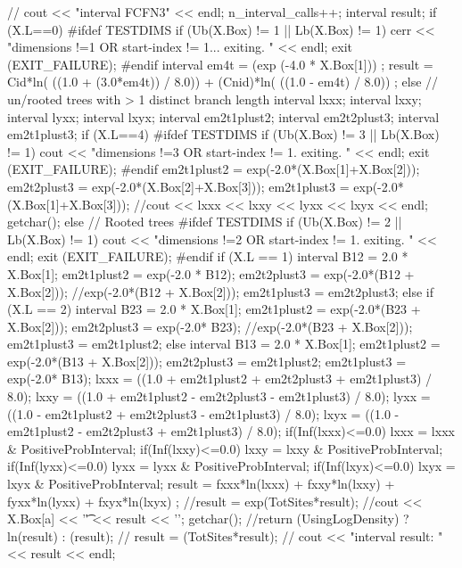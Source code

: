 \begin{DoxyCode}
{ 
  // cout << "interval FCFN3" << endl;
  n_interval_calls++;
  interval result;
  if (X.L==0)       
  {
    #ifdef TESTDIMS
    if (Ub(X.Box) != 1 || Lb(X.Box) != 1)
    {
      cerr << "dimensions !=1 OR start-index != 1... exiting. " 
           << endl; exit (EXIT_FAILURE);
    }
    #endif
    interval em4t = (exp (-4.0 * X.Box[1])) ;
    result = Cid*ln( ((1.0 + (3.0*em4t)) / 8.0)) + 
             (Cnid)*ln( ((1.0 - em4t) / 8.0)) ;
  }
  else      // un/rooted trees with > 1 distinct branch length
  {
    interval lxxx;
    interval lxxy;
    interval lyxx;
    interval lxyx;
    interval em2t1plust2;
    interval em2t2plust3;
    interval em2t1plust3;
    if (X.L==4)     
    {
      #ifdef TESTDIMS
      if (Ub(X.Box) != 3 || Lb(X.Box) != 1)
      {
        cout << "dimensions !=3 OR start-index != 1. exiting. " 
             << endl; exit (EXIT_FAILURE);
      }
      #endif
      em2t1plust2 = exp(-2.0*(X.Box[1]+X.Box[2]));
      em2t2plust3 = exp(-2.0*(X.Box[2]+X.Box[3]));
      em2t1plust3 = exp(-2.0*(X.Box[1]+X.Box[3]));
      //cout << lxxx << lxxy << lyxx << lxyx << endl; getchar();
    }
    else            // Rooted trees
    {
      #ifdef TESTDIMS
      if (Ub(X.Box) != 2 || Lb(X.Box) != 1)
      {
        cout << "dimensions !=2 OR start-index != 1. exiting. " 
             << endl; exit (EXIT_FAILURE);
      }
      #endif
      if (X.L == 1) 
      {
        interval B12 = 2.0 * X.Box[1];
        em2t1plust2 = exp(-2.0 * B12);
        em2t2plust3 = exp(-2.0*(B12 + X.Box[2]));
                    //exp(-2.0*(B12 + X.Box[2]));
        em2t1plust3 = em2t2plust3;
      }
      else if (X.L == 2)
      {
        interval B23 = 2.0 * X.Box[1];
        em2t1plust2 = exp(-2.0*(B23 + X.Box[2]));
        em2t2plust3 = exp(-2.0* B23);
                    //exp(-2.0*(B23 + X.Box[2]));
        em2t1plust3 = em2t1plust2;
      }
      else          
      {
        interval B13 = 2.0 * X.Box[1];
        em2t1plust2 = exp(-2.0*(B13 + X.Box[2]));
        em2t2plust3 = em2t1plust2;
        em2t1plust3 = exp(-2.0* B13);
      }
    }
    lxxx = ((1.0 + em2t1plust2 + em2t2plust3 + em2t1plust3) / 8.0);
    lxxy = ((1.0 + em2t1plust2 - em2t2plust3 - em2t1plust3) / 8.0);
    lyxx = ((1.0 - em2t1plust2 + em2t2plust3 - em2t1plust3) / 8.0);
    lxyx = ((1.0 - em2t1plust2 - em2t2plust3 + em2t1plust3) / 8.0);
    if(Inf(lxxx)<=0.0) lxxx = lxxx & PositiveProbInterval;
    if(Inf(lxxy)<=0.0) lxxy = lxxy & PositiveProbInterval;
    if(Inf(lyxx)<=0.0) lyxx = lyxx & PositiveProbInterval;
    if(Inf(lxyx)<=0.0) lxyx = lxyx & PositiveProbInterval;
    result = fxxx*ln(lxxx) + fxxy*ln(lxxy) + fyxx*ln(lyxx) + fxyx*ln(lxyx) ;
  }
  //result = exp(TotSites*result);
  //cout << X.Box[a] << '\t' << result << '\n'; getchar();
  //return (UsingLogDensity) ? ln(result) : (result);
  // result = (TotSites*result);
  //   cout << "interval result: " << result << endl;

}
\end{DoxyCode}
